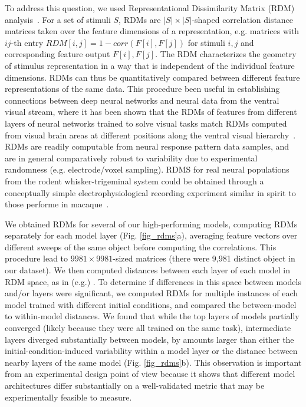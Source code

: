 To address this question, we used Representational Dissimilarity Matrix (RDM) analysis~\cite{Kriegeskorte2008}.
For a set of stimuli $S$, RDMs are $|S| \times |S|$-shaped correlation distance matrices taken over the feature dimensions of a representation, e.g. matrices with $ij$-th entry $RDM[i, j] = 1 - corr(F[i], F[j])$ for stimuli $i, j$ and corresponding feature output $F[i], F[j]$.
The RDM characterizes the geometry of stimulus representation in a way that is independent of the individual feature dimensions.  RDMs can thus be quantitatively compared between different feature representations of the same data.
This procedure been useful in establishing connections between deep neural networks and neural data from the ventral visual stream, where it has been shown that the RDMs of features from different layers of neural networks trained to solve visual tasks match RDMs computed from visual brain areas at different positions along the ventral visual hierarchy~\cite{cadieu2014deep, Yamins2014, khaligh2014deep}. 
RDMs are readily computable from neural response pattern data samples, and are in general comparatively robust to variability due to experimental randomness (e.g. electrode/voxel sampling).
RDMS for real neural populations from the rodent whisker-trigeminal system could be obtained through a conceptually simple electrophysiological recording experiment similar in spirit to those performe in macaque~\cite{Yamins2014}.

We obtained RDMs for several of our high-performing models, computing RDMs separately for each model layer (Fig. \ref{fig_rdms}a), averaging feature vectors over different sweeps of the same object before computing the correlations.
This procedure lead to $9981\times9981$-sized matrices (there were 9,981 distinct object in our dataset).
We then computed distances between each layer of each model in RDM space, as in (e.g.) \cite{khaligh2014deep}.
To determine if differences in this space between models and/or layers were significant, we computed RDMs for multiple instances of each model trained with different initial conditions, and compared the between-model to within-model distances.
We found that while the top layers of models partially converged (likely because they were all trained on the same task), intermediate layers diverged substantially between models, by amounts larger than either the initial-condition-induced variability within a model layer or the distance between nearby layers of the same model (Fig. \ref{fig_rdms}b).
This observation is important from an experimental design point of view because it shows that different model architectures differ substantially on a well-validated metric that may be experimentally feasible to measure. 

